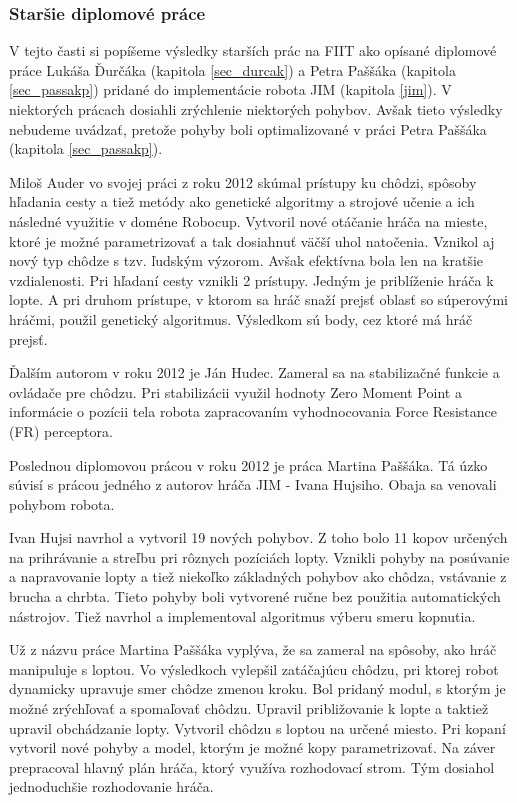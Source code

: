 \subsubsection{Staršie diplomové práce}\label{sec_auder_hudec}

V tejto časti si popíšeme výsledky starších prác na FIIT ako opísané diplomové práce Lukáša Ďurčáka (kapitola \ref{sec_durcak}) a Petra Paššáka (kapitola \ref{sec_passakp}) pridané do implementácie robota JIM (kapitola \ref{jim}). V niektorých prácach dosiahli zrýchlenie niektorých pohybov. Avšak tieto výsledky nebudeme uvádzať, pretože pohyby boli optimalizované v práci Petra Paššáka (kapitola \ref{sec_passakp}).

Miloš Auder vo svojej práci\cite{auder} z roku 2012 skúmal prístupy ku chôdzi, spôsoby hľadania cesty a tiež metódy ako genetické algoritmy a strojové učenie a ich následné využitie v doméne Robocup. Vytvoril nové otáčanie hráča na mieste, ktoré je možné parametrizovať a tak dosiahnuť väčší uhol natočenia. Vznikol aj nový typ chôdze s tzv. ľudským výzorom. Avšak efektívna bola len na kratšie vzdialenosti. Pri hľadaní cesty vznikli 2 prístupy. Jedným je priblíženie hráča k lopte. A pri druhom prístupe, v ktorom sa hráč snaží prejsť oblasť so súperovými hráčmi, použil genetický algoritmus. Výsledkom sú body, cez ktoré má hráč prejsť.

Ďalším autorom v roku 2012 je Ján Hudec\cite{hudec}. Zameral sa na stabilizačné funkcie a ovládače pre chôdzu. Pri stabilizácii využil hodnoty Zero Moment Point a informácie o pozícii tela robota zapracovaním vyhodnocovania Force Resistance (FR) perceptora.

Poslednou diplomovou prácou v roku 2012 je práca Martina Paššáka. Tá úzko súvisí s prácou jedného z autorov hráča JIM - Ivana Hujsiho. Obaja sa venovali pohybom robota. 

Ivan Hujsi\cite{Hujsi} navrhol a vytvoril 19 nových pohybov. Z toho bolo 11 kopov určených na prihrávanie a streľbu pri rôznych pozíciách lopty. Vznikli pohyby na posúvanie a napravovanie lopty a tiež niekoľko základných pohybov ako chôdza, vstávanie z brucha a chrbta. Tieto pohyby boli vytvorené ručne bez použitia automatických nástrojov. Tiež navrhol a implementoval algoritmus výberu smeru kopnutia.

Už z názvu práce Martina Paššáka\cite{passak_martin} vyplýva, že sa zameral na spôsoby, ako hráč manipuluje s loptou. Vo výsledkoch vylepšil zatáčajúcu chôdzu, pri ktorej robot dynamicky upravuje smer chôdze zmenou kroku. Bol pridaný modul, s ktorým je možné zrýchľovať a spomaľovať chôdzu. Upravil približovanie k lopte a taktiež upravil obchádzanie lopty. Vytvoril chôdzu s loptou na určené miesto. Pri kopaní vytvoril nové pohyby a model, ktorým je možné kopy parametrizovať. Na záver prepracoval hlavný plán hráča, ktorý využíva rozhodovací strom. Tým dosiahol jednoduchšie rozhodovanie hráča.